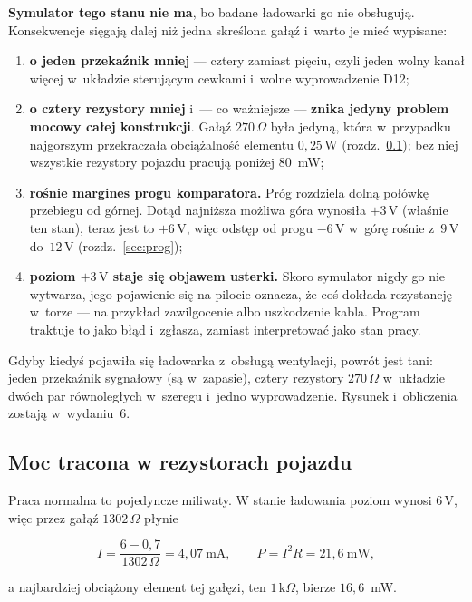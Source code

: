 \documentclass[a4paper,11pt]{article}
\newcommand{\ohm}{\,\Omega}
\newcommand{\kohm}{\,\mathrm{k}\Omega}
\newcommand{\volt}{\,\mathrm{V}}
\newcommand{\watt}{\,\mathrm{W}}
\begin{document}
\textbf{Symulator tego stanu nie ma}, bo badane ładowarki go nie obsługują. Konsekwencje
sięgają dalej niż jedna skreślona gałąź i~warto je mieć wypisane:

\begin{enumerate}
\item \textbf{o jeden przekaźnik mniej} --- cztery zamiast pięciu, czyli jeden wolny
      kanał więcej w~układzie sterującym cewkami i~wolne wyprowadzenie D12;
\item \textbf{o cztery rezystory mniej} i~--- co ważniejsze --- \textbf{znika jedyny
      problem mocowy całej konstrukcji}. Gałąź $270\ohm$ była jedyną, która w~przypadku
      najgorszym przekraczała obciążalność elementu $0{,}25\watt$
      (rozdz.~\ref{sec:moc}); bez niej wszystkie rezystory pojazdu pracują poniżej
      $80$~mW;
\item \textbf{rośnie margines progu komparatora.} Próg rozdziela dolną połówkę
      przebiegu od górnej. Dotąd najniższa możliwa góra wynosiła $+3\volt$ (właśnie
      ten stan), teraz jest to $+6\volt$, więc odstęp od progu $-6\volt$ w~górę rośnie
      z~$9\volt$ do~$12\volt$ (rozdz.~\ref{sec:prog});
\item \textbf{poziom $+3\volt$ staje się objawem usterki.} Skoro symulator nigdy go nie
      wytwarza, jego pojawienie się na pilocie oznacza, że coś dokłada rezystancję
      w~torze --- na przykład zawilgocenie albo uszkodzenie kabla. Program traktuje to
      jako błąd i~zgłasza, zamiast interpretować jako stan pracy.
\end{enumerate}

Gdyby kiedyś pojawiła się ładowarka z~obsługą wentylacji, powrót jest tani: jeden
przekaźnik sygnałowy (są w~zapasie), cztery rezystory $270\ohm$ w~układzie dwóch par
równoległych w~szeregu i~jedno wyprowadzenie. Rysunek i~obliczenia zostają w~wydaniu~6.

\subsection{Moc tracona w rezystorach pojazdu}
\label{sec:moc}

Praca normalna to pojedyncze miliwaty. W stanie ładowania poziom wynosi $6\volt$,
więc przez gałąź $1302\ohm$ płynie

\[
I=\frac{6-0{,}7}{1302\ohm}=4{,}07\ \mathrm{mA},
\qquad
P=I^2R=21{,}6\ \mathrm{mW},
\]

a najbardziej obciążony element tej gałęzi, ten $1\kohm$, bierze $16{,}6$~mW.
\end{document}
